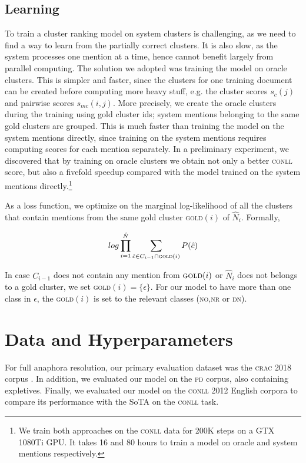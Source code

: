 \documentclass[10pt, a4paper]{article}
\newcommand{\ACRO}[1]{\textsc{#1}}
\newcommand{\CONLL}{\ACRO{conll}}
\newcommand{\CRAC}{\ACRO{crac}}
\newcommand{\PD}{\ACRO{pd}}
\newcommand{\DN}{\ACRO{dn}}
\newcommand{\NO}{\ACRO{no}}
\newcommand{\NR}{\ACRO{nr}}
\begin{document}
\subsection{Learning}
To train a cluster ranking model on system clusters is challenging, as we need to find a way to learn from the partially correct clusters. It is also slow, as the system processes one mention at a time, hence cannot benefit largely from parallel computing.
The solution we adopted was training the model on oracle clusters.
This 
is simpler and faster, since the clusters for one training document can be created before computing more heavy stuff, e.g. the cluster scores $s_c(j)$ and pairwise scores $s_{mc}(i,j)$. 
More precisely, we create the oracle clusters during the training using gold cluster ids; system mentions belonging to the same gold clusters are grouped.  
This is much faster 
than training the model
on the system mentions directly, since training on the system mentions requires
computing scores for each mention separately. 
In a preliminary experiment, we discovered that by training on 
oracle clusters 
we obtain not only a better {\CONLL} score, but also a 
fivefold speedup
compared with the model trained on the system mentions directly.\footnote{We train both approaches on the {\CONLL} data for 200K steps on a GTX 1080Ti GPU. It takes 16 and 80 hours to train a model on oracle and system mentions respectively.} 


As a 
loss function, we 
optimize on the marginal log-likelihood of all the clusters that contain mentions from the same gold cluster \textsc{gold}$(i)$ of $\hat{N}_i$.
Formally,

\small
$$log \prod_{i=1}^{\hat{N}}\sum_{\hat{c} \in C_{i-1} \cap \textsc{gold}(i)} P(\hat{c})$$
\normalsize


In case $C_{i-1}$ does not contain any mention from $\textsc{gold}(i)$ or $\hat{N}_i$ does not belongs to a gold cluster, we set \textsc{gold}$(i) = \{\epsilon\}$. For our model to have more than one class in $\epsilon$, the \textsc{gold}$(i)$ is set to the relevant classes ({\NO},{\NR} or {\DN}). 



\section{Data and Hyperparameters}

For full anaphora resolution, our 
primary evaluation dataset was 
the {\CRAC} 2018 corpus \cite{poesio2018crac}. 
In addition, we evaluated our model on the {\PD} corpus, also containing expletives.
Finally, we  evaluated our model on the {\CONLL} 2012 English corpora \cite{pradhan2012conllst} to compare its performance with the SoTA on the {\CONLL} task. 
\end{document}
